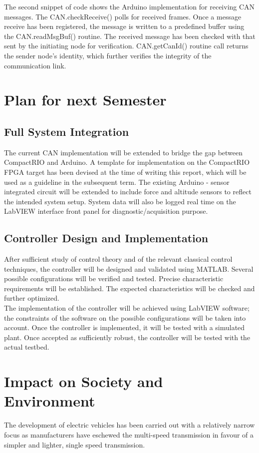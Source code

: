 \documentclass{article}
\begin{document}
\noindent The second snippet of code shows the Arduino implementation for receiving CAN messages. The CAN.checkReceive() polls for received frames. Once a message receive has been registered, the message is written to a predefined buffer using the CAN.readMsgBuf() routine. The received message has been checked with that sent by the initiating node for verification. CAN.getCanId() routine call returns the sender node’s identity, which further verifies the integrity of the communication link.

\section{Plan for next Semester}
\subsection{Full System Integration}
The current CAN implementation will be extended to bridge the gap between CompactRIO and Arduino. A template for implementation on the CompactRIO FPGA target has been devised at the time of writing this report, which will be used as a guideline in the subsequent term. The existing Arduino - sensor integrated circuit will be extended to include force and altitude sensors to reflect the intended system setup. System data will also be logged real time on the LabVIEW interface front panel for diagnostic/acquisition purpose. 

\subsection{Controller Design and Implementation}
After sufficient study of control theory and of the relevant classical control techniques, the controller will be designed and validated using MATLAB. Several possible configurations will be verified and tested. Precise characteristic requirements will be established. The expected characteristics will be checked and further optimized. \\

\noindent The implementation of the controller will be achieved using LabVIEW software; the constraints of the software on the possible configurations will be taken into account. Once the controller is implemented, it will be tested with a simulated plant. Once accepted as sufficiently robust, the controller will be tested with the actual testbed. 

\section{Impact on Society and Environment}
The development of electric vehicles has been carried out with a relatively narrow focus as manufacturers have eschewed the multi-speed transmission in favour of a simpler and lighter, single speed transmission. \\
\end{document}
